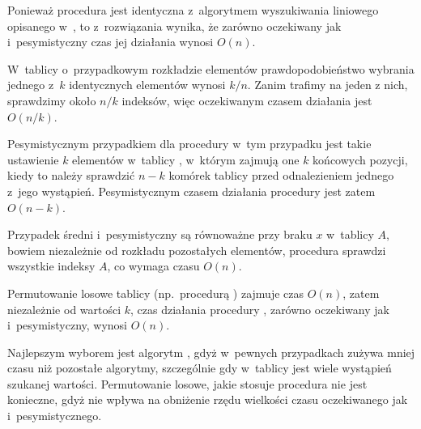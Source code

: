\subproblem %
Ponieważ procedura  jest identyczna z~algorytmem wyszukiwania liniowego opisanego w~, to z~rozwiązania  wynika, że zarówno oczekiwany jak i~pesymistyczny czas jej działania wynosi $O(n)$.

\subproblem %
W~tablicy  o~przypadkowym rozkładzie elementów prawdopodobieństwo wybrania jednego z~$k$ identycznych elementów wynosi $k/n$. Zanim trafimy na jeden z nich, sprawdzimy około $n/k$ indeksów, więc oczekiwanym czasem działania jest $O(n/k)$.

Pesymistycznym przypadkiem dla procedury w~tym przypadku jest takie ustawienie $k$ elementów w~tablicy , w~którym zajmują one $k$ końcowych pozycji, kiedy to należy sprawdzić $n-k$ komórek tablicy przed odnalezieniem jednego z~jego wystąpień. Pesymistycznym czasem działania procedury jest zatem $O(n-k)$.

\subproblem %
Przypadek średni i~pesymistyczny są równoważne przy braku $x$ w~tablicy $A$, bowiem niezależnie od rozkładu pozostałych elementów, procedura sprawdzi wszystkie indeksy $A$, co wymaga czasu $O(n)$.

\subproblem %
Permutowanie losowe tablicy (np.\ procedurą ) zajmuje czas $O(n)$, zatem niezależnie od wartości $k$, czas działania procedury , zarówno oczekiwany jak i~pesymistyczny, wynosi $O(n)$.

\subproblem %
Najlepszym wyborem jest algorytm , gdyż w~pewnych przypadkach zużywa mniej czasu niż pozostałe algorytmy, szczególnie gdy w~tablicy jest wiele wystąpień szukanej wartości. Permutowanie losowe, jakie stosuje procedura  nie jest konieczne, gdyż nie wpływa na obniżenie rzędu wielkości czasu oczekiwanego jak i~pesymistycznego.

\endinput
